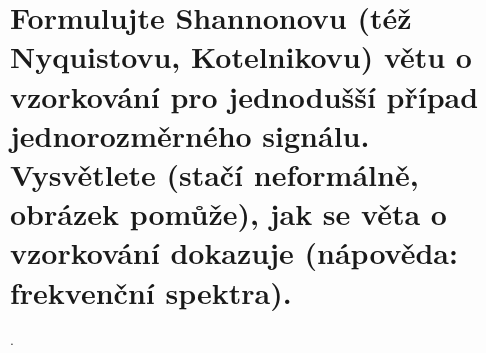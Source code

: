 \section{Formulujte Shannonovu (též Nyquistovu, Kotelnikovu) větu o vzorkování pro jednodušší případ jednorozměrného 
signálu. Vysvětlete (stačí neformálně, obrázek pomůže), jak se věta o vzorkování dokazuje (nápověda: frekvenční 
spektra).}.